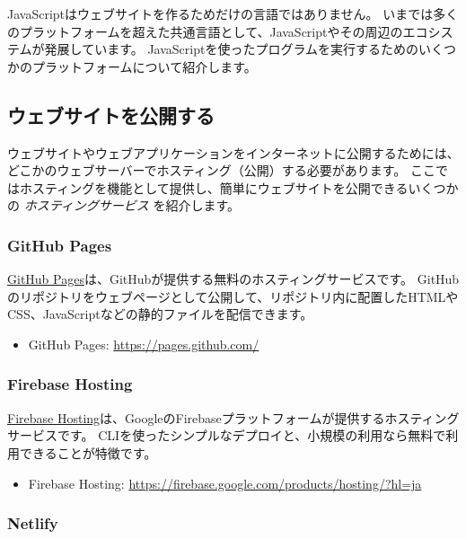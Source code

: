 JavaScriptはウェブサイトを作るためだけの言語ではありません。
いまでは多くのプラットフォームを超えた共通言語として、JavaScriptやその周辺のエコシステムが発展しています。
JavaScriptを使ったプログラムを実行するためのいくつかのプラットフォームについて紹介します。

\hypertarget{publishing-website}{%
\subsection{ウェブサイトを公開する}\label{publishing-website}}

ウェブサイトやウェブアプリケーションをインターネットに公開するためには、どこかのウェブサーバーでホスティング（公開）する必要があります。
ここではホスティングを機能として提供し、簡単にウェブサイトを公開できるいくつかの
\emph{ホスティングサービス} を紹介します。

\hypertarget{github-pages}{%
\subsubsection{GitHub Pages}\label{github-pages}}

\href{https://pages.github.com/}{GitHub
Pages}は、GitHubが提供する無料のホスティングサービスです。
GitHubのリポジトリをウェブページとして公開して、リポジトリ内に配置したHTMLやCSS、JavaScriptなどの静的ファイルを配信できます。
\begin{itemize}
\item GitHub Pages: \url{https://pages.github.com/}
\end{itemize}

\hypertarget{firebase-hosting}{%
\subsubsection{Firebase Hosting}\label{firebase-hosting}}

\href{https://firebase.google.com/products/hosting/?hl=ja}{Firebase
Hosting}は、GoogleのFirebaseプラットフォームが提供するホスティングサービスです。
CLIを使ったシンプルなデプロイと、小規模の利用なら無料で利用できることが特徴です。
\begin{itemize}
\item Firebase Hosting: \url{https://firebase.google.com/products/hosting/?hl=ja}
\end{itemize}

\hypertarget{netlify}{%
\subsubsection{Netlify}\label{netlify}}

